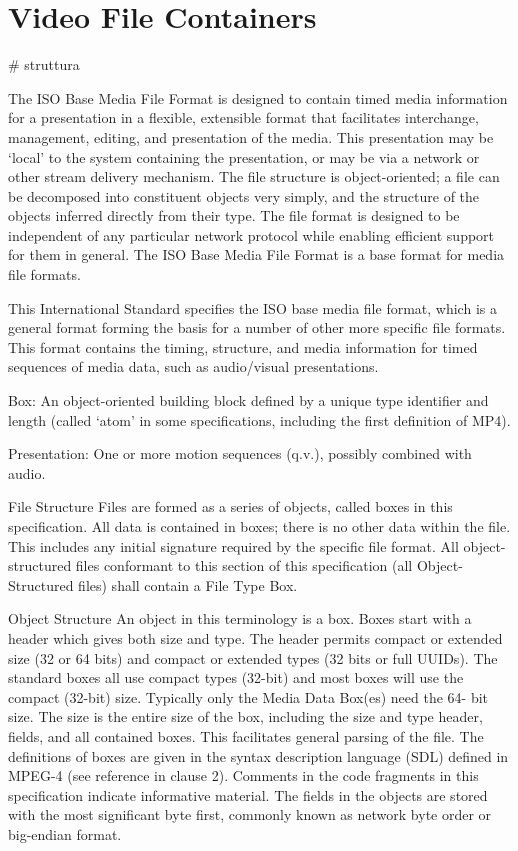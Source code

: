 \chapter{Video File Containers}


# struttura

The ISO Base Media File Format is designed to contain timed media information for a presentation in a
flexible, extensible format that facilitates interchange, management, editing, and presentation of the media.
This presentation may be ‘local’ to the system containing the presentation, or may be via a network or other
stream delivery mechanism.
The file structure is object-oriented; a file can be decomposed into constituent objects very simply, and the
structure of the objects inferred directly from their type.
The file format is designed to be independent of any particular network protocol while enabling efficient
support for them in general.
The ISO Base Media File Format is a base format for media file formats.

This International Standard specifies the ISO base media file format, which is a general format forming the
basis for a number of other more specific file formats. This format contains the timing, structure, and media
information for timed sequences of media data, such as audio/visual presentations.

Box:
An object-oriented building block defined by a unique type identifier and length (called ‘atom’ in some
specifications, including the first definition of MP4).

Presentation:
One or more motion sequences (q.v.), possibly combined with audio.

File Structure
Files are formed as a series of objects, called boxes in this specification. All data is contained in boxes; there
is no other data within the file. This includes any initial signature required by the specific file format.
All object-structured files conformant to this section of this specification (all Object-Structured files) shall
contain a File Type Box.


Object Structure
An object in this terminology is a box.
Boxes start with a header which gives both size and type. The header permits compact or extended size (32
or 64 bits) and compact or extended types (32 bits or full UUIDs). The standard boxes all use compact types
(32-bit) and most boxes will use the compact (32-bit) size. Typically only the Media Data Box(es) need the 64-
bit size.
The size is the entire size of the box, including the size and type header, fields, and all contained boxes. This
facilitates general parsing of the file.
The definitions of boxes are given in the syntax description language (SDL) defined in MPEG-4 (see reference
in clause 2). Comments in the code fragments in this specification indicate informative material.
The fields in the objects are stored with the most significant byte first, commonly known as network byte order
or big-endian format.

